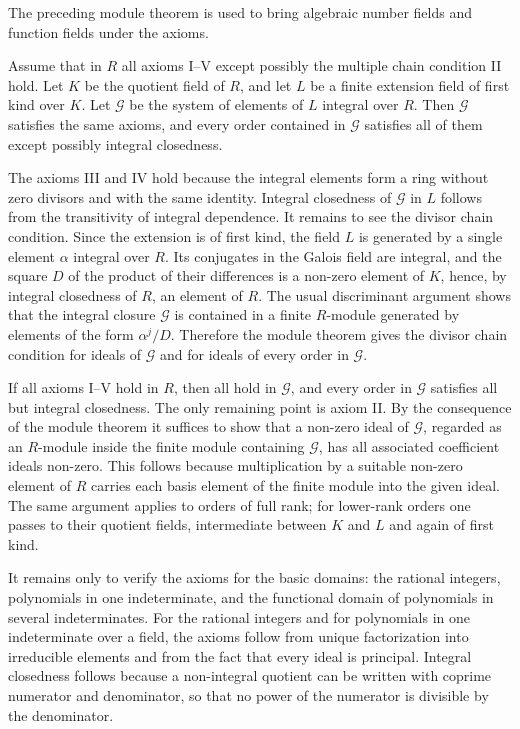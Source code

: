 \documentclass[12pt]{article}
\begin{document}
The preceding module theorem is used to bring algebraic number fields and function fields under the axioms.

Assume that in $R$ all axioms I--V except possibly the multiple chain condition II hold. Let $K$ be the quotient field of $R$, and let $L$ be a finite extension field of first kind over $K$. Let $\mathcal G$ be the system of elements of $L$ integral over $R$. Then $\mathcal G$ satisfies the same axioms, and every order contained in $\mathcal G$ satisfies all of them except possibly integral closedness.

The axioms III and IV hold because the integral elements form a ring without zero divisors and with the same identity. Integral closedness of $\mathcal G$ in $L$ follows from the transitivity of integral dependence. It remains to see the divisor chain condition. Since the extension is of first kind, the field $L$ is generated by a single element $\alpha$ integral over $R$. Its conjugates in the Galois field are integral, and the square $D$ of the product of their differences is a non-zero element of $K$, hence, by integral closedness of $R$, an element of $R$. The usual discriminant argument shows that the integral closure $\mathcal G$ is contained in a finite $R$-module generated by elements of the form $\alpha^j/D$. Therefore the module theorem gives the divisor chain condition for ideals of $\mathcal G$ and for ideals of every order in $\mathcal G$.

If all axioms I--V hold in $R$, then all hold in $\mathcal G$, and every order in $\mathcal G$ satisfies all but integral closedness. The only remaining point is axiom II. By the consequence of the module theorem it suffices to show that a non-zero ideal of $\mathcal G$, regarded as an $R$-module inside the finite module containing $\mathcal G$, has all associated coefficient ideals non-zero. This follows because multiplication by a suitable non-zero element of $R$ carries each basis element of the finite module into the given ideal. The same argument applies to orders of full rank; for lower-rank orders one passes to their quotient fields, intermediate between $K$ and $L$ and again of first kind.

It remains only to verify the axioms for the basic domains: the rational integers, polynomials in one indeterminate, and the functional domain of polynomials in several indeterminates. For the rational integers and for polynomials in one indeterminate over a field, the axioms follow from unique factorization into irreducible elements and from the fact that every ideal is principal. Integral closedness follows because a non-integral quotient can be written with coprime numerator and denominator, so that no power of the numerator is divisible by the denominator.
\end{document}
